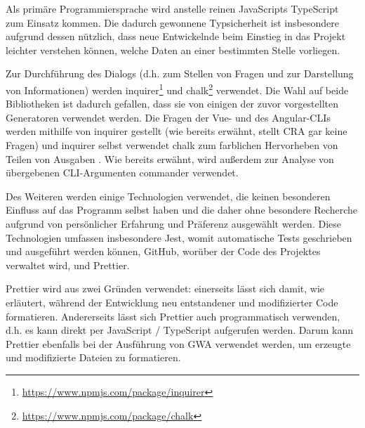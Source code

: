 Als primäre Programmiersprache wird anstelle reinen JavaScripts TypeScript zum Einsatz kommen. Die dadurch gewonnene Typsicherheit ist insbesondere aufgrund dessen nützlich, dass neue Entwickelnde beim Einstieg in das Projekt leichter verstehen können, welche Daten an einer bestimmten Stelle vorliegen.

Zur Durchführung des Dialogs (d.h. zum Stellen von Fragen und zur Darstellung von Informationen) werden inquirer\footnote{\url{https://www.npmjs.com/package/inquirer}} und chalk\footnote{\url{https://www.npmjs.com/package/chalk}} verwendet. Die Wahl auf beide Bibliotheken ist dadurch gefallen, dass sie von einigen der zuvor vorgestellten Generatoren verwendet werden. Die Fragen der Vue- und des Angular-\gls{CLI}s werden mithilfe von inquirer gestellt \cite{angular_cli_uses_inquirer} \cite{vue_cli_uses_inquirer} (wie bereits erwähnt, stellt \gls{CRA} gar keine Fragen) und inquirer selbst verwendet chalk zum farblichen Hervorheben von Teilen von Ausgaben \cite{inquirer_uses_chalk}. Wie bereits erwähnt, wird außerdem zur Analyse von übergebenen \gls{CLI}-Argumenten commander verwendet.

Des Weiteren werden einige Technologien verwendet, die keinen besonderen Einfluss auf das Programm selbst haben und die daher ohne besondere Recherche aufgrund von persönlicher Erfahrung und Präferenz ausgewählt werden. Diese Technologien umfassen insbesondere Jest, womit automatische Tests geschrieben und ausgeführt werden können, GitHub, worüber der Code des Projektes verwaltet wird, und Prettier.

Prettier wird aus zwei Gründen verwendet: einerseits lässt sich damit, wie erläutert, während der Entwicklung neu entstandener und modifizierter Code formatieren. Andererseits lässt sich Prettier auch programmatisch verwenden, d.h. es kann direkt per JavaScript / TypeScript aufgerufen werden. Darum kann Prettier ebenfalls bei der Ausführung von \gls{GWA} verwendet werden, um erzeugte und modifizierte Dateien zu formatieren.
